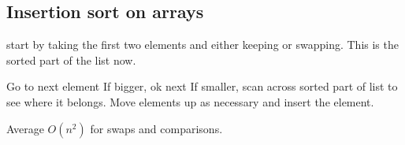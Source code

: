 
\subsection{Insertion sort on arrays}

start by taking the first two elements and either keeping or swapping.
This is the sorted part of the list now.

Go to next element
If bigger, ok next
If smaller, scan across sorted part of list to see where it belongs.
Move elements up as necessary and insert the element.

Average \(O(n^2)\) for swaps and comparisons.

